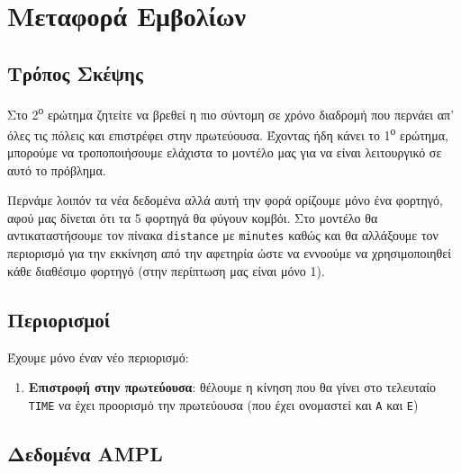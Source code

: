 \documentclass[
]{article}
\providecommand{\tightlist}{%
  \setlength{\itemsep}{0pt}\setlength{\parskip}{0pt}}
\begin{document}
\hypertarget{ux3bcux3b5ux3c4ux3b1ux3c6ux3bfux3c1ux3ac-ux3b5ux3bcux3b2ux3bfux3bbux3afux3c9ux3bd}{%
\section{Μεταφορά Εμβολίων}\label{ux3bcux3b5ux3c4ux3b1ux3c6ux3bfux3c1ux3ac-ux3b5ux3bcux3b2ux3bfux3bbux3afux3c9ux3bd}}

\hypertarget{ux3c4ux3c1ux3ccux3c0ux3bfux3c2-ux3c3ux3baux3adux3c8ux3b7ux3c2-1}{%
\subsection{Τρόπος Σκέψης}\label{ux3c4ux3c1ux3ccux3c0ux3bfux3c2-ux3c3ux3baux3adux3c8ux3b7ux3c2-1}}

Στο 2\textsuperscript{ο} ερώτημα ζητείτε να βρεθεί η πιο σύντομη σε χρόνο διαδρομή που
περνάει απ' όλες τις πόλεις και επιστρέφει στην πρωτεύουσα. Έχοντας ήδη
κάνει το 1\textsuperscript{ο} ερώτημα, μπορούμε να τροποποιήσουμε ελάχιστα το μοντέλο
μας για να είναι λειτουργικό σε αυτό το πρόβλημα.

Περνάμε λοιπόν τα νέα δεδομένα αλλά αυτή την φορά ορίζουμε μόνο ένα
φορτηγό, αφού μας δίνεται ότι τα 5 φορτηγά θα φύγουν κομβόι. Στο μοντέλο
θα αντικαταστήσουμε τον πίνακα \texttt{distance} με \texttt{minutes} καθώς και θα
αλλάξουμε τον περιορισμό για την εκκίνηση από την αφετηρία ώστε να
εννοούμε να χρησιμοποιηθεί κάθε διαθέσιμο φορτηγό (στην περίπτωση μας
είναι μόνο 1).

\hypertarget{ux3c0ux3b5ux3c1ux3b9ux3bfux3c1ux3b9ux3c3ux3bcux3bfux3af-1}{%
\subsection{Περιορισμοί}\label{ux3c0ux3b5ux3c1ux3b9ux3bfux3c1ux3b9ux3c3ux3bcux3bfux3af-1}}

Έχουμε μόνο έναν νέο περιορισμό:

\begin{enumerate}
\def\labelenumi{\arabic{enumi}.}
\tightlist
\item
  \textbf{Επιστροφή στην πρωτεύουσα}: θέλουμε η κίνηση που θα γίνει στο
  τελευταίο \texttt{TIME} να έχει προορισμό την πρωτεύουσα (που έχει
  ονομαστεί και \texttt{A} και \texttt{Ε})
\end{enumerate}

\hypertarget{ux3b4ux3b5ux3b4ux3bfux3bcux3adux3bdux3b1-ampl-1}{%
\subsection{Δεδομένα AMPL}\label{ux3b4ux3b5ux3b4ux3bfux3bcux3adux3bdux3b1-ampl-1}}
\end{document}

